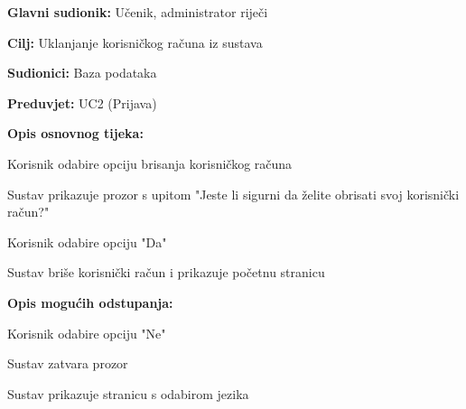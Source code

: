 					\noindent {}
					\begin{packed_item}
						
						\item \textbf{Glavni sudionik: }Učenik, administrator riječi
						\item  \textbf{Cilj:} Uklanjanje korisničkog računa iz sustava
						\item  \textbf{Sudionici:} Baza podataka
						\item  \textbf{Preduvjet:} UC2 (Prijava)
						\item  \textbf{Opis osnovnog tijeka:}
						
						\item[] \begin{packed_enum}
							
							\item Korisnik odabire opciju brisanja korisničkog računa
							\item Sustav prikazuje prozor s upitom "Jeste li sigurni da želite obrisati svoj korisnički račun?"
							\item Korisnik odabire opciju "Da"
							\item Sustav briše korisnički račun i prikazuje početnu stranicu
						\end{packed_enum}
						
						\item  \textbf{Opis mogućih odstupanja:}
						
						\item[] \begin{packed_item}
							
							\item[3.a] Korisnik odabire opciju "Ne"
							\item[] \begin{packed_enum}
								
								\item Sustav zatvara prozor
								\item Sustav prikazuje stranicu s odabirom jezika
								
							\end{packed_enum}
							
						\end{packed_item}
					\end{packed_item}
					
